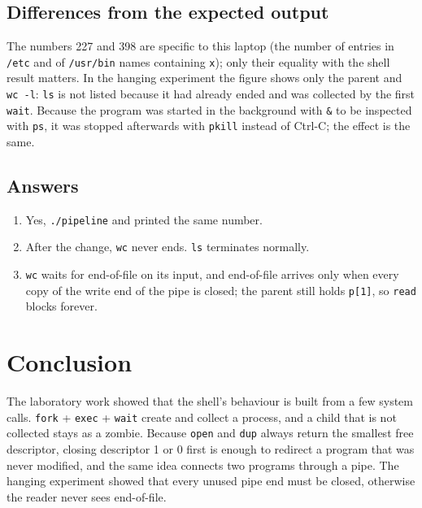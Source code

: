 \documentclass[12pt,a4paper]{article}
\newcommand{\inlinecmd}[1]{\texttt{\detokenize{#1}}}
\begin{document}
\subsection{Differences from the expected output}

The numbers 227 and 398 are specific to this laptop (the number of entries in \texttt{/etc} and of \texttt{/usr/bin} names containing \texttt{x}); only their equality with the shell result matters. In the hanging experiment the figure shows only the parent and \texttt{wc -l}: \texttt{ls} is not listed because it had already ended and was collected by the first \texttt{wait}. Because the program was started in the background with \texttt{\&} to be inspected with \texttt{ps}, it was stopped afterwards with \texttt{pkill} instead of Ctrl-C; the effect is the same.

\subsection{Answers}

\begin{enumerate}
  \item Yes, \texttt{./pipeline} and \inlinecmd{ls /etc | wc -l} printed the same number.
  \item After the change, \texttt{wc} never ends. \texttt{ls} terminates normally.
  \item \texttt{wc} waits for end-of-file on its input, and end-of-file arrives only when every copy of the write end of the pipe is closed; the parent still holds \texttt{p[1]}, so \texttt{read} blocks forever.
\end{enumerate}

\newpage
\section*{Conclusion}

The laboratory work showed that the shell's behaviour is built from a few system calls. \texttt{fork} + \texttt{exec} + \texttt{wait} create and collect a process, and a child that is not collected stays as a zombie. Because \texttt{open} and \texttt{dup} always return the smallest free descriptor, closing descriptor 1 or 0 first is enough to redirect a program that was never modified, and the same idea connects two programs through a pipe. The hanging experiment showed that every unused pipe end must be closed, otherwise the reader never sees end-of-file.
\end{document}
